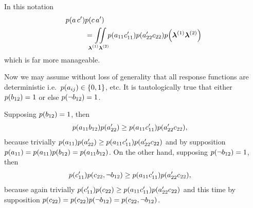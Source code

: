 In this notation
\begin{align}\label{eq:quadraticintegral}
\p{a\, c'}&\p{c\, a'}
\\\nonumber&=\iint\limits_{\mathclap{\setlambda^{(1)}\setlambda^{(2)}}}\p{a_{11}c'_{11}}\p{a'_{22}c_{22}}\p{\setlambda^{(1)}\setlambda^{(2)}}
\end{align}
which is far more manageable.




Now we may assume without loss of generality that all response functions are deterministic i.e.~$\p{a_{ij}}\in\brackets{0,1}$, etc. %
It is tautologically true that either $\p{b_{12}}=1$ or else $\p{\nb_{12}}=1$.

Supposing $\p{b_{12}}=1$, then
\begin{align}\begin{split}\label{eq:ifb12}
&\p{a_{11}b_{12}}\p{a'_{22}}\geq \p{a_{11}c'_{11}}\p{a'_{22}c_{22}},
\end{split}\end{align}
because trivially $\p{a_{11}}\p{a'_{22}}\geq \p{a_{11}c'_{11}}\p{a'_{22}c_{22}}$ and by supposition $\p{a_{11}}=\p{a_{11}}\p{b_{12}}=\p{a_{11}b_{12}}$.
%
%
On the other hand, supposing $\p{\nb_{12}}=1$, then
\begin{align}\begin{split}\label{eq:ifnotb12}
&\p{c'_{11}}\p{c_{22},\nb_{12}}\geq \p{a_{11}c'_{11}}\p{a'_{22}c_{22}},
\end{split}\end{align}
because again trivially  $\p{c'_{11}}\p{c_{22}}\geq \p{a_{11}c'_{11}}\p{a'_{22}c_{22}}$ and this time by supposition $\p{c_{22}}=\p{c_{22}}\p{\nb_{12}}=\p{c_{22},\nb_{12}}$.

